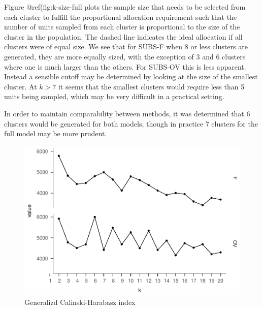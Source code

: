 \documentclass[man]{apa6}
\theoremstyle{definition}
\theoremstyle{definition}
\theoremstyle{definition}
\theoremstyle{remark}
\begin{document}
Figure @ref(fig:k-size-full plots the sample size that needs to be
selected from each cluster to fulfill the proportional allocation
requirement such that the number of units sampled from each cluster is
proportional to the size of the cluster in the population. The dashed
line indicates the ideal allocation if all clusters were of equal size.
We see that for SUBS-F when 8 or less clusters are generated, they are
more equally sized, with the exception of 3 and 6 clusters where one is
much larger than the others. For SUBS-OV this is less apparent. Instead
a sensible cutoff may be determined by looking at the size of the
smallest cluster. At \(k > 7\) it seems that the smallest clusters would
require less than 5 units being sampled, which may be very difficult in
a practical setting.

In order to maintain comparability between methods, it was determined
that 6 clusters would be generated for both models, though in practice 7
clusters for the full model may be more prudent.

\begin{figure}
\centering
\includegraphics{Method_files/figure-latex/ch-full-1.pdf}
\caption{\label{fig:ch-full}Generalizd Calinski-Harabasz index}
\end{figure}
\end{document}
